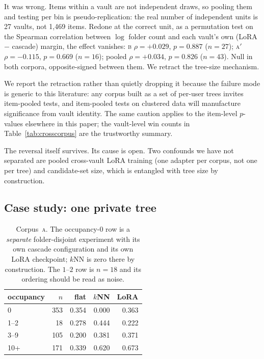 \documentclass[11pt]{article}
\newcommand{\corpA}{\textsc{a}}
\newcommand{\corpB}{\textsc{b}}
\newcommand{\corpAp}{\textsc{a}$'$}
\begin{document}
It was wrong.
Items within a vault are not independent draws, so pooling them and testing per bin is pseudo-replication: the real number of independent units is 27 vaults, not 1{,}469 items.
Redone at the correct unit, as a permutation test on the Spearman correlation between $\log$ folder count and each vault's own (LoRA $-$ cascade) margin, the effect vanishes:
\corpB{} $\rho{=}{+}0.029$, $p{=}0.887$ ($n{=}27$);
\corpAp{} $\rho{=}{-}0.115$, $p{=}0.669$ ($n{=}16$);
pooled $\rho{=}{+}0.034$, $p{=}0.826$ ($n{=}43$).
Null in both corpora, opposite-signed between them.
We retract the tree-size mechanism.

We report the retraction rather than quietly dropping it because the failure mode is generic to this literature: any corpus built as a set of per-user trees invites item-pooled tests, and item-pooled tests on clustered data will manufacture significance from vault identity.
The same caution applies to the item-level $p$-values elsewhere in this paper; the vault-level win counts in Table~\ref{tab:crosscorpus} are the trustworthy summary.

The reversal itself survives.
Its cause is open.
Two confounds we have not separated are pooled cross-vault LoRA training (one adapter per corpus, not one per tree) and candidate-set size, which is entangled with tree size by construction.

\subsection{Case study: one private tree}
\label{sec:corpusa}

\begin{table}[t]
  \centering
  \small
  \begin{tabular}{lrrrr}
    \toprule
    occupancy & $n$ & flat & $k$NN & LoRA \\
    \midrule
    0     & 353 & 0.354 & 0.000 & 0.363 \\
    1--2  & 18  & 0.278 & 0.444 & 0.222 \\
    3--9  & 105 & 0.200 & 0.381 & 0.371 \\
    10+   & 171 & 0.339 & 0.620 & 0.673 \\
    \bottomrule
  \end{tabular}
  \caption{Corpus~\corpA{}. The occupancy-$0$ row is a \emph{separate} folder-disjoint experiment with its own cascade configuration and its own LoRA checkpoint; $k$NN is zero there by construction. The $1$--$2$ row is $n{=}18$ and its ordering should be read as noise.}
  \label{tab:coverage}
\end{table}
\end{document}
